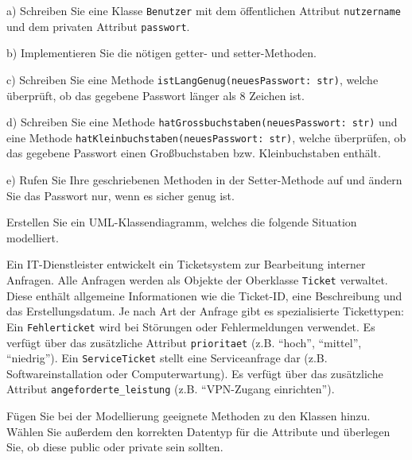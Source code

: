 \documentclass[11pt, a4paper, oneside]{article}
\begin{document}
	\pagebreak
	
	
	a) Schreiben Sie eine Klasse \texttt{Benutzer} mit dem öffentlichen Attribut \texttt{nutzername} und dem privaten Attribut \texttt{passwort}.
	
	b) Implementieren Sie die nötigen getter- und setter-Methoden.
	
	c) Schreiben Sie eine Methode \texttt{istLangGenug(neuesPasswort: str)}, welche überprüft, ob das gegebene Passwort länger als 8 Zeichen ist.
	
	d) Schreiben Sie eine Methode \texttt{hatGrossbuchstaben(neuesPasswort: str)} und eine Methode \texttt{hatKleinbuchstaben(neuesPasswort: str)}, welche überprüfen, ob das gegebene Passwort einen Großbuchstaben bzw. Kleinbuchstaben enthält.
	
	
	e) Rufen Sie Ihre geschriebenen Methoden in der Setter-Methode auf und ändern Sie das Passwort nur, wenn es sicher genug ist.
	
	
	Erstellen Sie ein UML-Klassendiagramm\footnotemark[4], welches die folgende Situation modelliert.
	
	Ein IT-Dienstleister entwickelt ein Ticketsystem zur Bearbeitung interner Anfragen.
	Alle Anfragen werden als Objekte der Oberklasse \texttt{Ticket} verwaltet.
	Diese enthält allgemeine Informationen wie die Ticket-ID, eine Beschreibung und das Erstellungsdatum.
	Je nach Art der Anfrage gibt es spezialisierte Tickettypen:
	Ein \texttt{Fehlerticket} wird bei Störungen oder Fehlermeldungen verwendet.
	Es verfügt über das zusätzliche Attribut \texttt{prioritaet} (z.B. ``hoch'', ``mittel'', ``niedrig'').
	Ein \texttt{ServiceTicket} stellt eine Serviceanfrage dar (z.B. Softwareinstallation oder Computerwartung).
	Es verfügt über das zusätzliche Attribut \texttt{angeforderte\_leistung} (z.B. ``VPN-Zugang einrichten'').
	
	Fügen Sie bei der Modellierung geeignete Methoden zu den Klassen hinzu.
	Wählen Sie außerdem den korrekten Datentyp für die Attribute und überlegen Sie, ob diese public oder private sein sollten.
	
\end{document}
